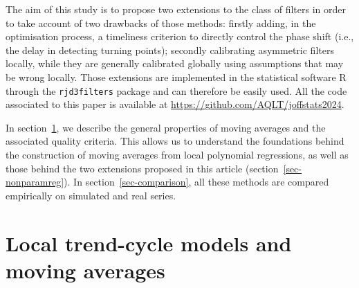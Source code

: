 \documentclass[
]{article}
\newcommand\1{\mathds{1}}
\begin{document}
The aim of this study is to propose two extensions to the
\textcite{proietti2008} class of filters in order to take account of two
drawbacks of those methods: firstly adding, in the optimisation process,
a timeliness criterion to directly control the phase shift (i.e., the
delay in detecting turning points); secondly calibrating asymmetric
filters locally, while they are generally calibrated globally using
assumptions that may be wrong locally. Those extensions are implemented
in the statistical software R \autocite{logicielr} through the
\texttt{rjd3filters} package \autocite{rjd3filters} and can therefore be
easily used. All the code associated to this paper is available at
\url{https://github.com/AQLT/joffstats2024}.

In section~\ref{sec-propMM}, we describe the general properties of
moving averages and the associated quality criteria. This allows us to
understand the foundations behind the construction of moving averages
from local polynomial regressions, as well as those behind the two
extensions proposed in this article (section~\ref{sec-nonparamreg}). In
section~\ref{sec-comparison}, all these methods are compared empirically
on simulated and real series.

\section{Local trend-cycle models and moving averages}\label{sec-propMM}
\end{document}
